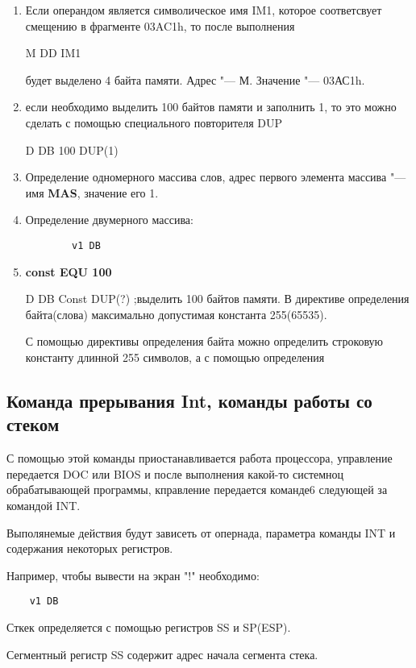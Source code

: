 \begin{enumerate}
    \item Если операндом является символическое имя IM1, которое соответсвует смещению в фрагменте 03AC1h, то после выполнения 
    
    M DD IM1

    будет выделено 4 байта памяти. Адрес "--- М. Значение "--- 03АС1h.

    \item если необходимо выделить 100 байтов памяти и заполнить 1, то это можно сделать с помощью специального повторителя DUP
    
    D DB 100 DUP(1)

    \item Определение одномерного массива слов, адрес первого элемента массива "--- имя \textbf{MAS}, значение его 1.
    \item Определение двумерного массива:
    \begin{verbatim}
        v1 DB
    \end{verbatim}
    \item \textbf{const EQU 100}
    
    D DB Const DUP(?) ;выделить 100 байтов памяти. В директиве определения байта(слова) максимально допустимая константа 255(65535).

    С помощью директивы определения байта можно определить строковую константу длинной 255 символов, а с помощью определения 
\end{enumerate}

\subsection{Команда прерывания Int, команды работы со стеком}

С помощью этой команды приостанавливается работа процессора, управление передается DOC или BIOS и после выполнения какой-то системноц обрабатывающей программы, кправление передается команде6 следующей за командой INT.

Выполянемые действия будут зависеть от опернада, параметра команды INT и содержания некоторых регистров.

Например, чтобы вывести на экран "!" необходимо:
\begin{verbatim}
    v1 DB
\end{verbatim}
Сткек определяется с помощью регистров SS и SP(ESP).

Сегментный регистр SS содержит адрес начала сегмента стека.

